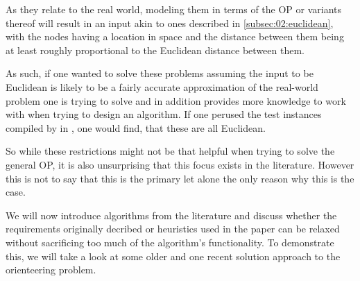 As they relate to the real world, modeling them in terms of the OP or variants thereof 
will result in an input akin to ones described in \cref*{subsec:02:euclidean}, 
with the nodes having a location in space and the distance between them being at least roughly proportional to the Euclidean distance between them.

As such, if one wanted to solve these problems assuming the input to be Euclidean is likely to be a fairly accurate approximation of the real-world problem one is trying to solve and in addition provides more knowledge to work with when trying to design an algorithm.
If one perused the test instances compiled by \citeauthor{vansteenwegen_orienteering_2011} in \cite{vansteenwegen_orienteering_2011}, 
one would find, that these are all Euclidean. 

So while these restrictions might not be that helpful when trying to solve the general OP, it is also unsurprising that this focus exists in the literature.
However this is not to say that this is the primary let alone the only reason why this is the case.

We will now introduce algorithms from the literature and discuss 
whether the requirements originally decribed or heuristics used in the paper can be relaxed without sacrificing too much of the algorithm's functionality.
To demonstrate this, we will take a look at some older \cite{tsiligiridis_heuristic_1984} and one recent \cite{szwarc_novel_2022} solution approach to the orienteering problem.
